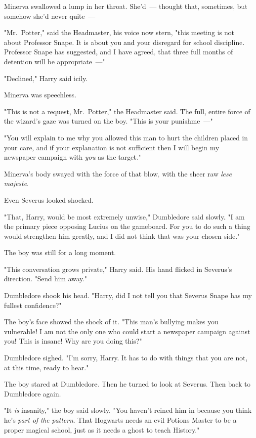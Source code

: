 Minerva swallowed a lump in her throat. She'd~--- thought that, sometimes, but
somehow she'd never quite~---

"Mr.~Potter," said the Headmaster, his voice now stern, "this meeting is not
about Professor Snape. It is about you and your disregard for school
discipline. Professor Snape has suggested, and I have agreed, that three full
months of detention will be appropriate~---"

"Declined," Harry said icily.

Minerva was speechless.

"This is not a request, Mr.~Potter," the Headmaster said. The full, entire
force of the wizard's gaze was turned on the boy. "This is your punishme~---"

"You will explain to me why you allowed this man to hurt the children placed in
your care, and if your explanation is not sufficient then I will begin my
newspaper campaign with \emph{you} as the target."

Minerva's body swayed with the force of that blow, with the sheer raw
\emph{lese majeste}.

Even Severus looked shocked.

"That, Harry, would be most extremely unwise," Dumbledore said slowly. "I am
the primary piece opposing Lucius on the gameboard. For you to do such a thing
would strengthen him greatly, and I did not think that was your chosen side."

The boy was still for a long moment.

"This conversation grows private," Harry said. His hand flicked in Severus's
direction. "Send him away."

Dumbledore shook his head. "Harry, did I not tell you that Severus Snape has my
fullest confidence?"

The boy's face showed the shock of it. "This man's bullying makes you
vulnerable! I am not the only one who could start a newspaper campaign against
you! This is insane! Why are you doing this?"

Dumbledore sighed. "I'm sorry, Harry. It has to do with things that you are
not, at this time, ready to hear."

The boy stared at Dumbledore. Then he turned to look at Severus. Then back to
Dumbledore again.

"It \emph{is} insanity," the boy said slowly. "You haven't reined him in
because you think he's \emph{part of the pattern}. That Hogwarts needs an evil
Potions Master to be a proper magical school, just as it needs a ghost to teach
History."

